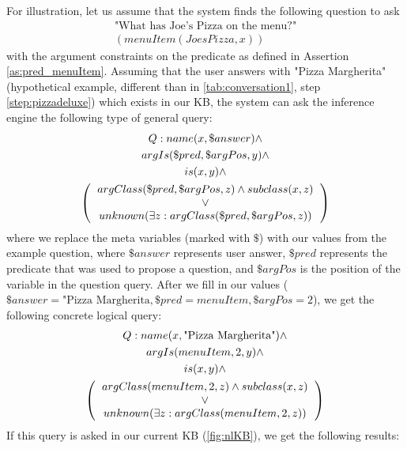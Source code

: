 For illustration, let us assume that the system finds the following question to
ask 
\begin{equation*}
\begin{gathered}
\text{"What has Joe's Pizza on the menu?"}\\
(menuItem(JoesPizza,x))
\end{gathered}
\end{equation*}
with the argument constraints on the predicate as defined in Assertion 
\ref{as:pred_menuItem}. Assuming that the user answers with "Pizza Margherita"
(hypothetical example, different than in \autoref{tab:conversation1}, step
\ref{step:pizzadeluxe}) which exists in our KB, the system can ask the inference
engine the following type of general query:
\begin{equation}\label{q:generalConstraint}
\begin{gathered}
    Q:name(x,\$answer)\land \\ %
    argIs(\$pred,\$argPos,y)\land \\ %
    is(x,y)\land \\
    \left(
    \begin{tabular}{c}
        $argClass(\$pred,\$argPos,z) \land  subclass(x,z)$\\
        $\lor$\\
        $unknown(\exists z:argClass(\$pred,\$argPos,z))$ \\
    \end{tabular}
    \right)
\end{gathered}
\end{equation}
where we replace the meta variables (marked with $\$$) with our values from 
the example question, where $\$answer$ represents user answer, $\$pred$ 
represents the predicate that was used to propose a question, and 
$\$argPos$ is the position of the variable in the question query. After we
fill in our values ($\$answer=\text{"Pizza Margherita}, \$pred=menuItem, 
\$argPos=2$), we get the following concrete logical query:
\begin{equation}\label{q:constraintQuery}
\begin{gathered}
   Q:name(x,\text{"Pizza Margherita"})\land \\ 
    argIs(menuItem,2,y)\land \\
    is(x,y)\land \\
    \left(
    \begin{tabular}{c}
        $argClass(menuItem,2,z) \land  subclass(x,z)$\\
        $\lor$\\
        $unknown(\exists z: argClass(menuItem,2,z))$ \\
    \end{tabular}
    \right)
\end{gathered}
\end{equation}
If this query is asked in our current KB (\autoref{fig:nlKB}), we get the 
following results:

